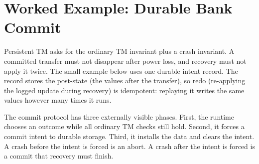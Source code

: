 \section{Worked Example: Durable Bank Commit}
\label{sec:durable-bank-example}

Persistent TM asks for the ordinary TM invariant plus a crash invariant. A
committed transfer must not disappear after power loss, and recovery must not
apply it twice. The small example below uses one durable intent record. The
record stores the post-state (the values after the transfer), so redo
(re-applying the logged update during recovery) is idempotent: replaying it
writes the same values however many times it runs.

The commit protocol has three externally visible phases. First, the runtime
chooses an outcome while all ordinary TM checks still hold. Second, it forces a
commit intent to durable storage. Third, it installs the data and clears the
intent. A crash before the intent is forced is an abort. A crash after the
intent is forced is a commit that recovery must finish.

